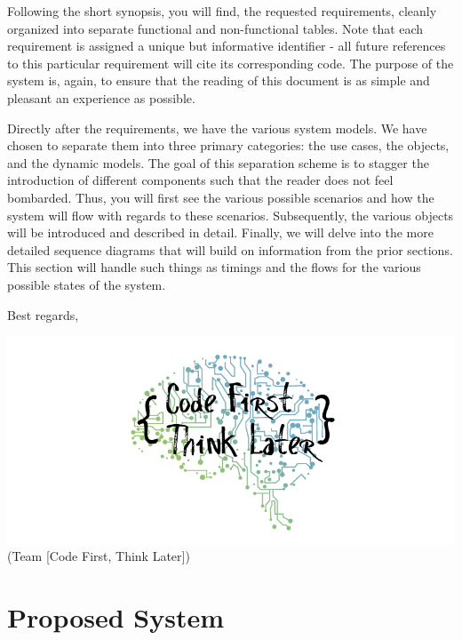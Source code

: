 \documentclass[12pt,letterpaper]{article}
\begin{document}
Following the short synopsis, you will find, the requested requirements, cleanly organized into separate functional 
and non-functional tables. Note that each requirement is assigned a unique but informative identifier - all future references
to this particular requirement will cite its corresponding code. The purpose of the system is, again, to ensure that the
reading of this document is as simple and pleasant an experience as possible. 

Directly after the requirements, we have the various system models. We have chosen to separate them into three
primary categories: the use cases, the objects, and the dynamic models. The goal of this separation scheme is to
stagger the introduction of different components such that the reader does not feel bombarded. Thus, you will 
first see the various possible scenarios and how the system will flow with regards to these scenarios. Subsequently, 
the various objects will be introduced and described in detail. Finally, we will delve into the more detailed sequence 
diagrams that will build on information from the prior sections. This section will handle such things as timings and
the flows for the various possible states of the system.

\vspace{1em}

\noindent Best regards,

\vspace{1em}

\begin{center}
	\includegraphics[scale=0.4]{imgs/logo.png} \\ \footnotesize{(Team [Code First, Think Later])}
\end{center}

\vspace{1em}

\section{Proposed System}
\end{document}
